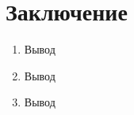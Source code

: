 \chapter*{Заключение}						%

\begin{enumerate}
	\item Вывод
	\item Вывод
	\item Вывод
\end{enumerate}

\clearpage